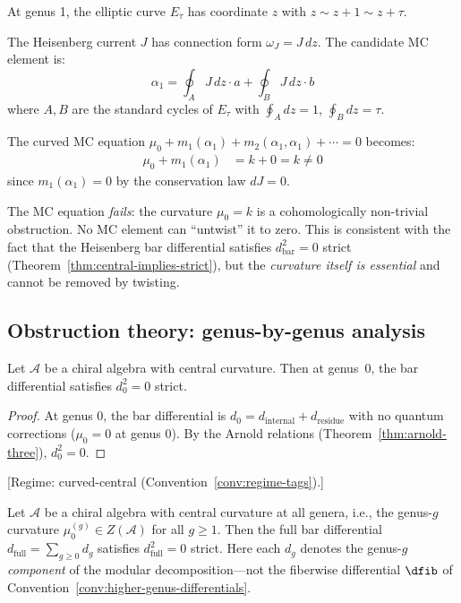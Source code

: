 \begin{example}
At genus 1, the elliptic curve $E_\tau$ has coordinate $z$ with $z \sim z + 1 \sim z + \tau$.

The Heisenberg current $J$ has connection form $\omega_J = J\,dz$.  The candidate MC element is:
\[\alpha_1 = \oint_A J\,dz \cdot a + \oint_B J\,dz \cdot b\]
where $A, B$ are the standard cycles of $E_\tau$ with $\oint_A dz = 1$, $\oint_B dz = \tau$.

The curved MC equation $\mu_0 + m_1(\alpha_1) + m_2(\alpha_1, \alpha_1) + \cdots = 0$ becomes:
\begin{align}
\mu_0 + m_1(\alpha_1) &= k + 0 = k \neq 0
\end{align}
since $m_1(\alpha_1) = 0$ by the conservation law $dJ = 0$.

The MC equation \emph{fails}: the curvature $\mu_0 = k$ is a cohomologically non-trivial obstruction.  No MC element can ``untwist'' it to zero.  This is consistent with the fact that the Heisenberg bar differential satisfies $d_{\mathrm{bar}}^2 = 0$ strict (Theorem~\ref{thm:central-implies-strict}), but the \emph{curvature itself is essential} and cannot be removed by twisting.
\end{example}
\fi

\subsection{Obstruction theory: genus-by-genus analysis}

\begin{theorem}\label{thm:genus-zero-strict}
Let $\mathcal{A}$ be a chiral algebra with central curvature. Then at genus~$0$,
the bar differential satisfies $d_0^2 = 0$ strict.
\end{theorem}

\begin{proof}
At genus 0, the bar differential is
$d_0 = d_{\text{internal}} + d_{\text{residue}}$
with no quantum corrections ($\mu_0 = 0$ at genus 0).
By the Arnold relations (Theorem~\ref{thm:arnold-three}), $d_0^2 = 0$.
\end{proof}

\begin{theorem}\label{thm:genus-induction-strict}
\textup{[Regime: curved-central\linebreak
\textup{(}Convention~\textup{\ref{conv:regime-tags})}.]}

Let $\mathcal{A}$ be a chiral algebra with central curvature at all genera,
i.e., the genus-$g$ curvature $\mu_0^{(g)} \in Z(\mathcal{A})$ for all $g \geq 1$.
Then the full bar differential $d_{\mathrm{full}} = \sum_{g \geq 0} d_g$ satisfies
$d_{\mathrm{full}}^2 = 0$ strict.
Here each $d_g$ denotes the genus-$g$ \emph{component} of the modular
decomposition---not the fiberwise differential $\dfib$ of
Convention~\textup{\ref{conv:higher-genus-differentials}}.
\end{theorem}

